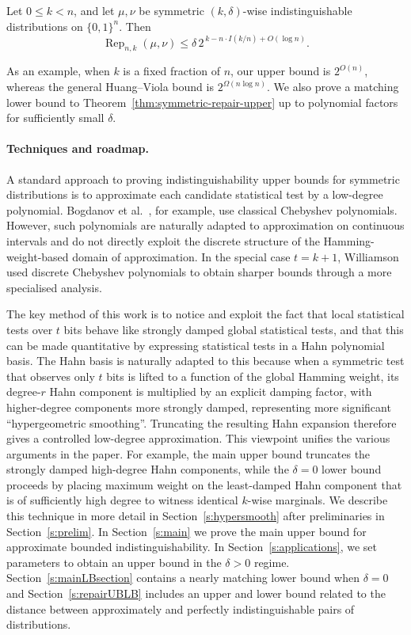 \documentclass[manuscript,nonacm]{acmart}
\begin{document}
\begin{theorem}
\label{thm:symmetric-repair-upper}
Let \(0\le k<n\), and let \(\mu,\nu\) be symmetric
\((k,\delta)\)-wise indistinguishable distributions on \(\{0,1\}^n\).
Then
\[
    \operatorname{Rep}_{n,k}(\mu,\nu)
    \le
    \delta\,2^{\,k-n\cdot I(k/n)+O(\log n)}.
\]
\end{theorem}
As an example, when \(k\) is a fixed fraction of \(n\), our upper bound is $2^{O(n)}$, whereas the general
Huang--Viola bound is \(2^{\Omega(n\log n)}\).
We also prove a matching lower bound to Theorem~\ref{thm:symmetric-repair-upper} up to polynomial factors for
sufficiently small \(\delta\). 


\paragraph{Techniques and roadmap.}
A standard approach to proving indistinguishability upper bounds for
symmetric distributions is to approximate each candidate statistical
test by a low-degree polynomial. Bogdanov et
al.~\cite{bogdanov2019approximate}, for example, use classical
Chebyshev polynomials. However, such polynomials are naturally adapted to
approximation on continuous intervals and do not directly exploit the discrete structure of the Hamming-weight-based domain of approximation. In the special case
\(t=k+1\), Williamson~\cite{williamson2021sharp} used discrete
Chebyshev polynomials to obtain sharper bounds through a more
specialised analysis. 

The key method of this work is to notice and exploit the fact that local statistical tests over $t$ bits behave like strongly damped global statistical tests, and that this can be made quantitative by expressing statistical tests in a Hahn polynomial basis. The Hahn basis is naturally adapted to this because when a symmetric test that observes only \(t\) bits is lifted to a function of the global Hamming weight, its degree-\(r\) Hahn component is multiplied by an explicit damping factor, with higher-degree components more strongly damped, representing more significant ``hypergeometric smoothing''.
Truncating the resulting Hahn expansion therefore gives a controlled
low-degree approximation.
This viewpoint unifies the various arguments in the paper. For example, the main upper bound truncates the strongly damped high-degree Hahn components, while the $\delta=0$ lower bound proceeds by placing maximum weight on the least-damped Hahn component that is of sufficiently high degree to witness identical $k$-wise marginals.
We describe this technique in more detail in Section~\ref{s:hypersmooth} after preliminaries in Section~\ref{s:prelim}. In Section~\ref{s:main} we prove the main upper bound for approximate bounded indistinguishability. In Section~\ref{s:applications}, we set parameters to obtain an upper bound in the $\delta>0$ regime. Section~\ref{s:mainLBsection} contains a nearly matching lower bound when $\delta=0$ and Section~\ref{s:repairUBLB} includes an upper and lower bound related to the distance between approximately and perfectly indistinguishable pairs of distributions.
\end{document}

